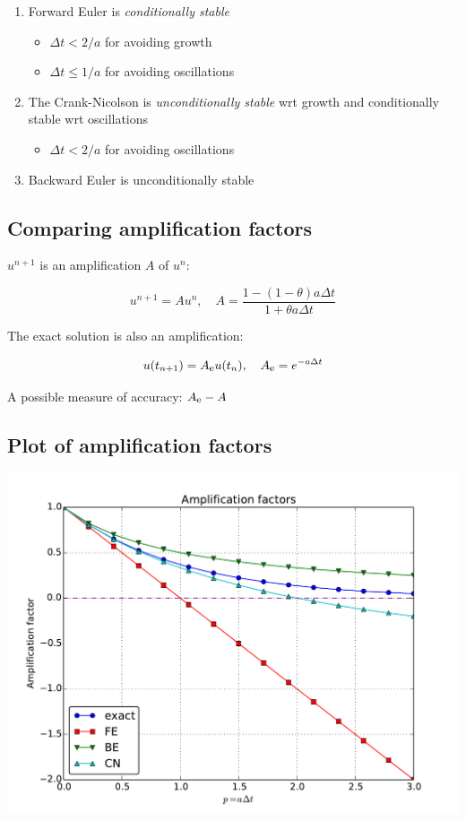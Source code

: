\documentclass[%
oneside,                 %
final,                   %
10pt]{article}
\begin{document}
\begin{enumerate}
\item Forward Euler is \emph{conditionally stable}
\begin{itemize}

   \item $\Delta t < 2/a$ for avoiding growth

   \item $\Delta t\leq 1/a$ for avoiding oscillations

\end{itemize}

\noindent
\item The Crank-Nicolson is \emph{unconditionally stable} wrt growth
   and conditionally stable wrt oscillations
\begin{itemize}

   \item $\Delta t < 2/a$ for avoiding oscillations

\end{itemize}

\noindent
\item Backward Euler is unconditionally stable
\end{enumerate}

\noindent
\subsection*{Comparing amplification factors}

$u^{n+1}$ is an amplification $A$ of $u^n$:

\[ u^{n+1} = Au^n,\quad A = \frac{1 - (1-\theta) a\Delta t}{1 + \theta a\Delta t} \]

The exact solution is also an amplification:

\[ u(t_{n+1}) = \Aex u(t_n), \quad \Aex = e^{-a\Delta t}\]

A possible measure of accuracy: $\Aex - A$

\subsection*{Plot of amplification factors}



\centerline{\includegraphics[width=0.9\linewidth]{fig-analysis/A_factors.pdf}}
\end{document}

